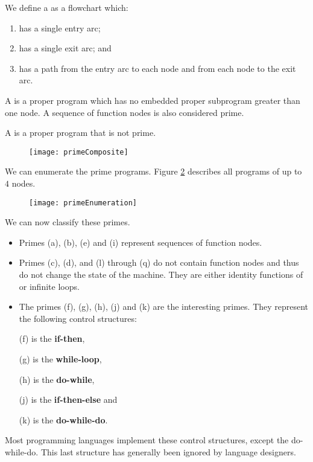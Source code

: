 We define a  as a flowchart which:
\begin{enumerate}
\item has a single entry arc;
\item has a single exit arc; and
\item has a path from the entry arc to each node and from each node to the exit arc.
\end{enumerate}

A  is a proper program which has no embedded proper subprogram greater than one node. A sequence of function nodes is also considered prime.

A  is a proper program that is not prime.

\begin{figure}[h]
\label{primeComposite}
\texttt{[image: primeComposite]}
\centering
\end{figure}

We can enumerate the prime programs. Figure \ref{primeEnumeration} describes all programs of up to $4$ nodes. 

\begin{figure}[h]
\label{primeEnumeration}
\texttt{[image: primeEnumeration]}
\centering
\end{figure}

We can now classify these primes.
\begin{itemize}
\item Primes (a), (b), (e) and (i) represent sequences of function nodes.
\item Primes (c), (d), and (l) through (q) do not contain function nodes and thus do not change the state of the machine. They are either identity functions of or infinite loops.
\item The primes (f), (g), (h), (j) and (k) are the interesting primes. They represent the following control structures:
\item[(f)] is the \textbf{if-then},
\item[(g)] is the \textbf{while-loop},
\item[(h)] is the \textbf{do-while},
\item[(j)] is the \textbf{if-then-else} and
\item[(k)] is the \textbf{do-while-do}.
\end{itemize}
Most programming languages implement these control structures, except the do-while-do. This last structure has generally been ignored by language designers.

